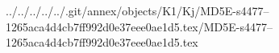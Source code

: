 ../../../../../.git/annex/objects/K1/Kj/MD5E-s4477--1265aca4d4cb7ff992d0e37eee0ae1d5.tex/MD5E-s4477--1265aca4d4cb7ff992d0e37eee0ae1d5.tex